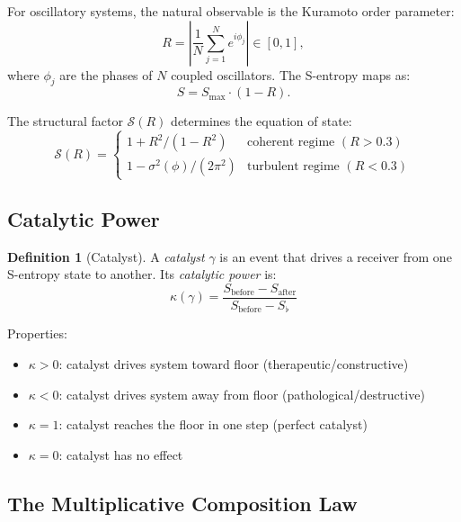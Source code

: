\documentclass[11pt,a4paper]{article}
\theoremstyle{definition}
\newtheorem{definition}[theorem]{Definition}
\theoremstyle{remark}
\newcommand{\Sfloor}{S_{\flat}}
\newcommand{\Rorder}{R}
\begin{document}
For oscillatory systems, the natural observable is the Kuramoto order parameter:
\begin{equation}
\Rorder = \left| \frac{1}{N} \sum_{j=1}^{N} e^{i\phi_j} \right| \in [0,1],
\end{equation}
where $\phi_j$ are the phases of $N$ coupled oscillators. The S-entropy maps as:
\begin{equation}
S = S_{\max} \cdot (1 - \Rorder).
\end{equation}

The structural factor $\mathcal{S}(\Rorder)$ determines the equation of state:
\begin{equation}
\mathcal{S}(\Rorder) = \begin{cases}
1 + \Rorder^2 / (1 - \Rorder^2) & \text{coherent regime } (\Rorder > 0.3) \\
1 - \sigma^2(\phi) / (2\pi^2) & \text{turbulent regime } (\Rorder < 0.3)
\end{cases}
\end{equation}

\subsection{Catalytic Power}

\begin{definition}[Catalyst]
A \emph{catalyst} $\gamma$ is an event that drives a receiver from one S-entropy state to another. Its \emph{catalytic power} is:
\begin{equation}
\boxed{\kappa(\gamma) = \frac{S_{\mathrm{before}} - S_{\mathrm{after}}}{S_{\mathrm{before}} - \Sfloor}}
\end{equation}
\end{definition}

Properties:
\begin{itemize}[nosep]
\item $\kappa > 0$: catalyst drives system toward floor (therapeutic/constructive)
\item $\kappa < 0$: catalyst drives system away from floor (pathological/destructive)
\item $\kappa = 1$: catalyst reaches the floor in one step (perfect catalyst)
\item $\kappa = 0$: catalyst has no effect
\end{itemize}

\subsection{The Multiplicative Composition Law}
\end{document}
